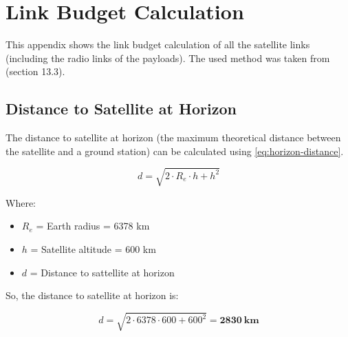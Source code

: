 %
%
%
%
%

%
%
%
%
%
%

\chapter{Link Budget Calculation} \label{anx:link-budget}

This appendix shows the link budget calculation of all the satellite links (including the radio links of the payloads). The used method was taken from \cite{larson2005} (section 13.3).

\section{Distance to Satellite at Horizon}

The distance to satellite at horizon (the maximum theoretical distance between the satellite and a ground station) can be calculated using \autoref{eq:horizon-distance}.

\begin{equation} \label{eq:horizon-distance}
d = \sqrt{2\cdot R_{e}\cdot h + h^{2}}
\end{equation}

Where:

\begin{itemize}
    \item $R_{e}$ = Earth radius = 6378 km
    \item $h$ = Satellite altitude = 600 km
    \item $d$ = Distance to sattellite at horizon
\end{itemize}

So, the distance to satellite at horizon is:

\begin{equation} \label{eq:horizon-distance-result}
d = \sqrt{2\cdot 6378\cdot 600 + 600^{2}} = \mathbf{2830\ km}
\end{equation}



